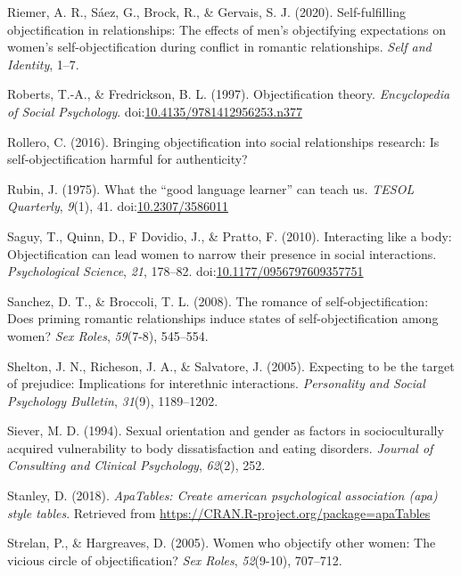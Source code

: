 \documentclass[man]{apa6}
\begin{document}
\hypertarget{ref-riemer2020self}{}
Riemer, A. R., Sáez, G., Brock, R., \& Gervais, S. J. (2020).
Self-fulfilling objectification in relationships: The effects of men's
objectifying expectations on women's self-objectification during
conflict in romantic relationships. \emph{Self and Identity}, 1--7.

\hypertarget{ref-robertsfredrickson}{}
Roberts, T.-A., \& Fredrickson, B. L. (1997). Objectification theory.
\emph{Encyclopedia of Social Psychology}.
doi:\href{https://doi.org/10.4135/9781412956253.n377}{10.4135/9781412956253.n377}

\hypertarget{ref-rollero2016bringing}{}
Rollero, C. (2016). Bringing objectification into social relationships
research: Is self-objectification harmful for authenticity?

\hypertarget{ref-rubin1975}{}
Rubin, J. (1975). What the ``good language learner'' can teach us.
\emph{TESOL Quarterly}, \emph{9}(1), 41.
doi:\href{https://doi.org/10.2307/3586011}{10.2307/3586011}

\hypertarget{ref-saguyetal2010}{}
Saguy, T., Quinn, D., F Dovidio, J., \& Pratto, F. (2010). Interacting
like a body: Objectification can lead women to narrow their presence in
social interactions. \emph{Psychological Science}, \emph{21}, 178--82.
doi:\href{https://doi.org/10.1177/0956797609357751}{10.1177/0956797609357751}

\hypertarget{ref-sanchez2008romance}{}
Sanchez, D. T., \& Broccoli, T. L. (2008). The romance of
self-objectification: Does priming romantic relationships induce states
of self-objectification among women? \emph{Sex Roles}, \emph{59}(7-8),
545--554.

\hypertarget{ref-shelton2005expecting}{}
Shelton, J. N., Richeson, J. A., \& Salvatore, J. (2005). Expecting to
be the target of prejudice: Implications for interethnic interactions.
\emph{Personality and Social Psychology Bulletin}, \emph{31}(9),
1189--1202.

\hypertarget{ref-siever1994sexual}{}
Siever, M. D. (1994). Sexual orientation and gender as factors in
socioculturally acquired vulnerability to body dissatisfaction and
eating disorders. \emph{Journal of Consulting and Clinical Psychology},
\emph{62}(2), 252.

\hypertarget{ref-R-apaTables}{}
Stanley, D. (2018). \emph{ApaTables: Create american psychological
association (apa) style tables}. Retrieved from
\url{https://CRAN.R-project.org/package=apaTables}

\hypertarget{ref-strelan2005women}{}
Strelan, P., \& Hargreaves, D. (2005). Women who objectify other women:
The vicious circle of objectification? \emph{Sex Roles},
\emph{52}(9-10), 707--712.
\end{document}
